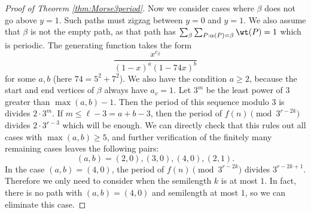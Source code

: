 \begin{proof}[Proof of Theorem \ref{thm:Morse3period}]
    Now we consider cases where $\beta$ does not go above $y=1$. Such paths must zigzag between $y=0$ and $y=1$. We also assume that $\beta$ is not the empty path, as that path has $\sum_{\beta}\sum_{P: \alpha(P)=\beta}\wt(P)=1$ which is periodic. The generating function takes the form
    \[\frac{x^{c_\beta}}{(1-x)^a(1-74x)^b}\]
    for some $a, b$ (here $74=5^2+7^2$). We also have the condition $a\geq 2$, because the start and end vertices of $\beta$ always have $a_v=1$. Let $3^m$ be the least power of $3$ greater than $\max(a, b)-1$. Then the period of this sequence modulo $3$ is divides $2\cdot 3^{m}$. If $m\leq \ell-3=a+b-3$, then the period of $f(n)\pmod{3^{r-2k}}$ divides $2\cdot 3^{r-3}$ which will be enough. We can directly check that this rules out all cases with $\max(a, b)\geq 5$, and further verification of the finitely many remaining cases leaves the following pairs:
    \[(a, b) = (2, 0), (3, 0), (4, 0),  (2, 1).\]
    In the case $(a, b)=(4, 0)$, the period of $f(n)\pmod{3^{r-2k}}$ divides $3^{r-2k+1}$. Therefore we only need to consider when the semilength $k$ is at most $1$. In fact, there is no path with $(a, b)=(4, 0)$ and semilength at most $1$, so we can eliminate this case.
    

\end{proof}
